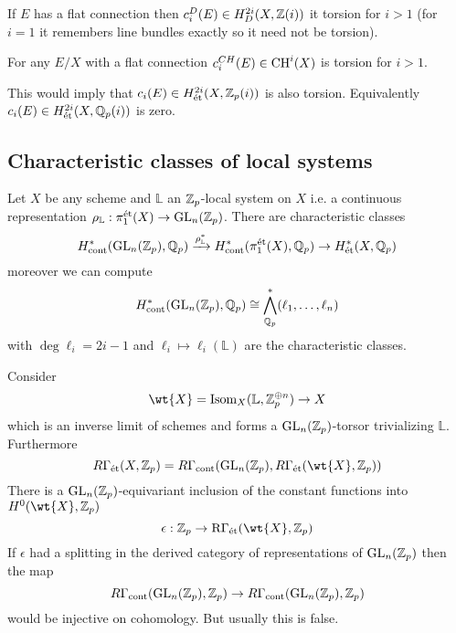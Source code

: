 \documentclass[12pt]{article}
\newcommand{\R}{\mathrm{R}}
\newcommand{\LL}{\mathbb{L}}
\begin{document}
\begin{theorem}
If $E$ has a flat connection then $c_i^D(E) \in H^{2i}_D(X, \mathbb{Z}(i))$ it torsion for $i > 1$ (for $i = 1$ it remembers line bundles exactly so it need not be torsion).
\end{theorem}

\begin{conj}
For any $E / X$ with a flat connection $c_i^{CH}(E) \in \mathrm{CH}^i(X)$ is torsion for $i > 1$. 
\end{conj}

This would imply that $c_i(E) \in H^{2i}_{\text{\'{e}t}}(X, \mathbb{Z}_p(i))$ is also torsion. Equivalently $c_i(E) \in H^{2i}_{\text{\'{e}t}}(X, \mathbb{Q}_p(i))$ is zero.


\subsection{Characteristic classes of \etale local systems}

\renewcommand{\cont}{\mathrm{cont}}
\newcommand{\Isom}{\mathrm{Isom}}

Let $X$ be any scheme and $\LL$ an \etale $\mathbb{Z}_p$-local system on $X$ i.e. a continuous representation $\rho_{\LL} : \pi_1^{\et}(X) \to \GL_n(\ZZ_p)$. There are characteristic classes
\[ H^*_{\cont}(\GL_n(\ZZ_p), \Q_p) \xrightarrow{\rho_{\LL}^*} H^*_{\cont}(\pi_1^{\et}(X), \Q_p) \to H^*_{\et}(X, \Q_p) \]
moreover we can compute
\[ H^*_{\cont}(\GL_n(\ZZ_p), \Q_p) \cong \bigwedge^*_{\Q_p}(\ell_1, \dots, \ell_n) \]
with $\deg{\ell_i} = 2i - 1$ and $\ell_i \mapsto \ell_i(\LL)$ are the characteristic classes.

Consider
\[ \wt{X} = \Isom_X(\LL, \ZZ_p^{\oplus n}) \to X \]
which is an inverse limit of schemes and forms a $\mathrm{GL}_n(\mathbb{Z}_p)$-torsor trivializing $\LL$. Furthermore
\[ R \Gamma_{\et}(X, \Z_p) = R \Gamma_{\cont}(\GL_n(\ZZ_p), R \Gamma_{\et}(\wt{X}, \Z_p)) \]
There is a $\mathrm{GL}_n(\mathbb{Z}_p)$-equivariant inclusion of the constant functions into $H^0(\wt{X}, \Z_p)$
\[ \epsilon : \Z_p \to \R \Gamma_{\et}(\wt{X}, \Z_p) \]
If $\epsilon$ had a splitting in the derived category of representations of $\mathrm{GL}_n(\mathbb{Z}_p)$ then the map
\[ R \Gamma_{\cont}(\GL_n(\Z_p), \Z_p) \to R \Gamma_{\cont}(\GL_n(\Z_p), \Z_p) \]
would be injective on cohomology. But usually this is false. 
\end{document}
